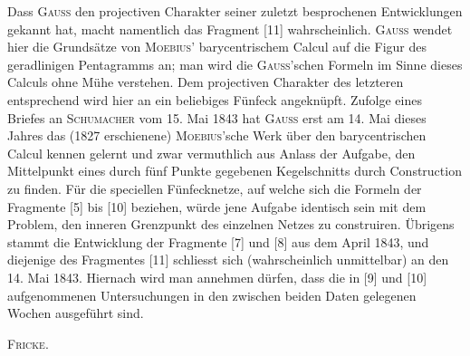Dass \textsc{Gauss} den projectiven Charakter seiner zuletzt besprochenen Entwicklungen gekannt hat, macht namentlich das Fragment [11] wahrscheinlich. \textsc{Gauss} wendet hier die Grundsätze von \textsc{Moebius}' barycentrischem Calcul auf die Figur des geradlinigen Pentagramms an; man wird die \textsc{Gauss}'schen Formeln im Sinne dieses Calculs ohne Mühe verstehen. Dem projectiven Charakter des letzteren entsprechend wird hier an ein beliebiges Fünfeck angeknüpft. Zufolge eines Briefes an \textsc{Schumacher} vom 15. Mai 1843 hat \textsc{Gauss} erst am 14. Mai dieses Jahres das (1827 erschienene) \textsc{Moebius}'sche Werk über den barycentrischen Calcul kennen gelernt und zwar vermuthlich aus Anlass der Aufgabe, den Mittelpunkt eines durch fünf Punkte gegebenen Kegelschnitts durch Construction zu finden. Für die speciellen Fünfecknetze, auf welche sich die Formeln der Fragmente [5] bis [10] beziehen, würde jene Aufgabe identisch sein mit dem Problem, den inneren Grenzpunkt des einzelnen Netzes zu construiren. Übrigens stammt die Entwicklung der Fragmente [7] und [8] aus dem April 1843, und diejenige des Fragmentes [11] schliesst sich (wahrscheinlich unmittelbar) an den 14. Mai 1843. Hiernach wird man annehmen dürfen, dass die in [9] und [10] aufgenommenen Untersuchungen in den zwischen beiden Daten gelegenen Wochen ausgeführt sind.

\hfill\textsc{Fricke}.

\noindent\hrulefill\par
